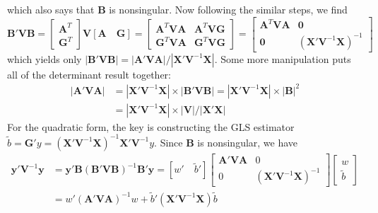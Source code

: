 \documentclass[12pt]{article}
\begin{document}
    which also says that \textbf{B} is nonsingular. Now following the similar steps, we find
    \begin{equation*}
    \textbf{B}'\mathbf{V}\textbf{B}=\begin{bmatrix}
        \mathbf{A}^T\\
        \mathbf{G}^T
        \end{bmatrix}
        \mathbf{V}[\mathbf{A} \quad \mathbf{G}]= \begin{bmatrix}
        \mathbf{A}^T\mathbf{V}\mathbf{A} & \mathbf{A}^T\mathbf{V}\mathbf{G}\\
        \mathbf{G}^T\mathbf{V}\mathbf{A}& \mathbf{G}^T\mathbf{V}\mathbf{G}
        \end{bmatrix}= \begin{bmatrix}
        \mathbf{A}^T\mathbf{V}\mathbf{A} & \textbf{0}\\
        \textbf{0} & (\mathbf{X}'\mathbf{V}^{-1}\mathbf{X})^{-1}
        \end{bmatrix}
    \end{equation*}
    which yields only $|\textbf{B}'\mathbf{V}\textbf{B}|=|\mathbf{A}'\mathbf{V}\mathbf{A}|/|\mathbf{X}'\mathbf{V}^{-1}\mathbf{X}|$. Some more manipulation puts all of the determinant result together:
    \begin{equation*}
    \begin{split}
    |\mathbf{A}'\mathbf{V}\mathbf{A}|&=|\mathbf{X}'\mathbf{V}^{-1}\mathbf{X}|\times |\textbf{B}'\mathbf{V}\textbf{B}|=|\mathbf{X}'\mathbf{V}^{-1}\mathbf{X}|\times |\textbf{B}|^2\\
    &=|\mathbf{X}'\mathbf{V}^{-1}\mathbf{X}|\times|\mathbf{V}|/|\mathbf{X}'\mathbf{X}|
    \end{split}
    \end{equation*}
    For the quadratic form, the key is constructing the GLS estimator $\tilde{b}=\mathbf{G}'y=(\mathbf{X}'\mathbf{V}^{-1}\mathbf{X})^{-1}\mathbf{X}'\mathbf{V}^{-1}y$. Since \textbf{B} is nonsingular, we have
    \begin{equation*}
    \begin{split}
        \textbf{y}'\mathbf{V}^{-1}\textbf{y}&=\textbf{y}'\textbf{B}(\textbf{B}'\mathbf{V}\textbf{B})^{-1}\textbf{B}'\textbf{y}=[w' \quad \tilde{b}']\begin{bmatrix}
        \mathbf{A}'\mathbf{V}\mathbf{A} & 0\\
        0&(\mathbf{X}'\mathbf{V}^{-1}\mathbf{X})^{-1}
        \end{bmatrix}\begin{bmatrix}
        w\\
        \tilde{b}
        \end{bmatrix}\\
        &=w'(\mathbf{A}'\mathbf{V}\mathbf{A})^{-1}w+\tilde{b}'(\mathbf{X}'\mathbf{V}^{-1}\mathbf{X})\tilde{b}
    \end{split}
    \end{equation*}
\end{document}

